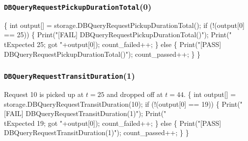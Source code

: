 \documentclass{article}
\def\nwendcode{\endtrivlist \endgroup}
\let\nwdocspar=\par
\theoremstyle{definition}
\begin{document}
\subsubsection{{\tt{}DBQueryRequestPickupDurationTotal}(0)}
\nwenddocs{}\endmoddef{}
\{
  int output[] = storage.DBQueryRequestPickupDurationTotal();
  if (!(output[0] == 25)) \{
    Print("[FAIL] DBQueryRequestPickupDurationTotal()");
    Print("\\tExpected 25; got "+output[0]);
    count_failed++;
  \} else \{
    Print("[PASS] DBQueryRequestPickupDurationTotal()");
    count_passed++;
  \}
\}
\nwendcode{}\nwdocspar
\subsubsection{{\tt{}DBQueryRequestTransitDuration}(1)}
Request 10 is picked up at $t=25$ and dropped off at $t=44$.
\nwenddocs{}\endmoddef{}
\{
  int output[] = storage.DBQueryRequestTransitDuration(10);
  if (!(output[0] == 19)) \{
    Print("[FAIL] DBQueryRequestTransitDuration(1)");
    Print("\\tExpected 19; got "+output[0]);
    count_failed++;
  \} else \{
    Print("[PASS] DBQueryRequestTransitDuration(1)");
    count_passed++;
  \}
\}
\nwendcode{}\nwdocspar
\end{document}
